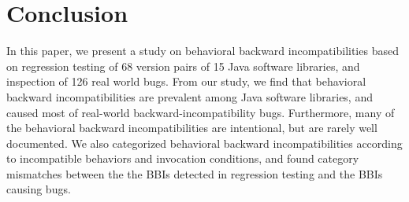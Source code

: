 \section{Conclusion}
\label{sec:conclusion}
In this paper, we present a study on behavioral backward incompatibilities based on regression testing of 68 version pairs of 15 Java software libraries, and inspection of 126 real world bugs. From our study, we find that behavioral backward incompatibilities are prevalent among Java software libraries, and caused most of real-world backward-incompatibility bugs. Furthermore, many of the behavioral backward incompatibilities are intentional, but are rarely well documented. We also categorized behavioral backward incompatibilities according to incompatible behaviors and invocation conditions, and found category mismatches between the the BBIs detected in regression testing and the BBIs causing bugs. 






\balance